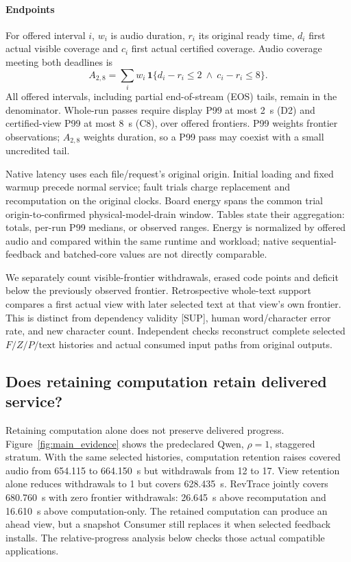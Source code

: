 \paragraph{Endpoints}
For offered interval $i$, $w_i$ is audio duration, $r_i$ its original
ready time, $d_i$ first actual visible coverage and $c_i$ first actual
certified coverage. Audio coverage meeting both deadlines is
\begin{equation}
 A_{2,8}=\sum_i w_i\,\mathbf{1}
 \{d_i-r_i\leq2\ \land\ c_i-r_i\leq8\}.
 \label{eq:credit}
\end{equation}
All offered intervals, including partial end-of-stream (EOS) tails,
remain in the denominator. Whole-run passes require display P99 at most
2~s (D2) and certified-view P99 at most 8~s (C8), over offered frontiers.
P99 weights frontier observations; $A_{2,8}$ weights duration, so a P99
pass may coexist with a small uncredited tail.

Native latency uses each file/request's original origin. Initial loading
and fixed warmup precede normal service; fault trials charge replacement
and recomputation on the original clocks. Board energy spans the common trial origin-to-confirmed
physical-model-drain window. Tables state their aggregation: totals,
per-run P99 medians, or observed ranges.
Energy is normalized by offered audio and compared within the same
runtime and workload; native sequential-feedback and batched-core
values are not directly comparable.

We separately count visible-frontier withdrawals, erased code points and
deficit below the previously observed frontier. Retrospective whole-text
support compares a first actual view with later selected text at that
view's own frontier. This is distinct from dependency validity [SUP],
human word/character error rate, and new character count. Independent
checks reconstruct complete selected $F/Z/P/\mathrm{text}$ histories and
actual consumed input paths from original outputs.

\subsection{Does retaining computation retain delivered service?}
Retaining computation alone does not preserve delivered progress.
Figure~\ref{fig:main_evidence} shows the predeclared Qwen,
$\rho=1$, staggered stratum. With the same selected histories, computation
retention raises covered audio from 654.115 to 664.150~s but withdrawals
from 12 to 17. View retention alone reduces withdrawals to 1 but covers
628.435~s. RevTrace jointly covers 680.760~s with zero frontier withdrawals:
26.645~s above recomputation and 16.610~s above computation-only.
The retained computation can produce an ahead view, but a snapshot
Consumer still replaces it when selected feedback installs. The
relative-progress analysis below checks those actual compatible
applications.

